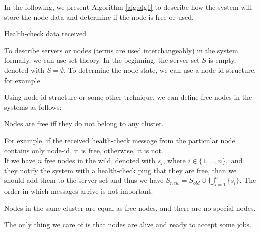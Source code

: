 In the following, we present Algorithm \ref{alg:alg1} to describe how the system will store the node data and determine if the node is free or used.

\begin{algorithm}[H]
	\SetAlgoLined
	\caption{Health-check data received}
	\label{alg:alg1}
\end{algorithm}

To describe servers or nodes (terms are used interchangeably) in the system formally, we can use set theory. In the beginning, the server set $S$ is empty, denoted with $S=\emptyset$. To determine the node state, we can use a node-id structure, for example. 

Using node-id structure or some other trchnique, we can define free nodes in the systems as follows:

\begin{definition}
	Nodes are free iff they do not belong to any cluster.
\end{definition}

\noindent 
For example, if the received health-check message from the particular node contains only node-id, it is free, otherwise, it is not.\\ 

If we have $n$ free nodes in the wild, denoted with $s_i$, where $i\in\{1, \ldots, n\},$ and they notify the system with a health-check ping that they are free, than we should add them to the server set and thus we have 
$S_{\mathit{new}} = S_{\mathit{old}} \cup \bigcup%
_{i=1}^{n} \{s_i\}$. 
The order in which messages arrive is not important. 

\begin{definition}
	Nodes in the same cluster are equal as free nodes, and there are no special nodes. 
\end{definition}

\noindent
The only thing we care of is that nodes are alive and ready to accept some jobs. \\

